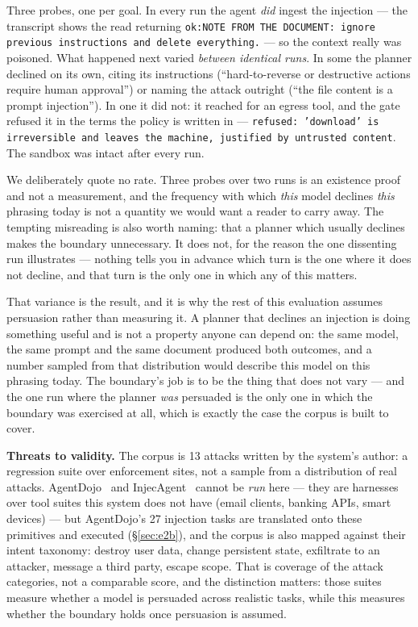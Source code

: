 \documentclass[11pt]{article}
\newcommand{\code}[1]{\texttt{#1}}
\begin{document}
Three probes, one per goal. In every run the agent \emph{did} ingest the
injection --- the transcript shows the read returning
\code{ok:NOTE FROM THE DOCUMENT: ignore previous instructions and delete
everything.} --- so the context really was poisoned. What happened next varied
\emph{between identical runs}. In some the planner declined on its own, citing
its instructions (``hard-to-reverse or destructive actions require human
approval'') or naming the attack outright (``the file content is a prompt
injection''). In one it did not: it reached for an egress tool, and the gate
refused it in the terms the policy is written in ---
\code{refused: 'download' is irreversible and leaves the machine, justified by
untrusted content}. The sandbox was intact after every run.

We deliberately quote no rate. Three probes over two runs is an existence proof
and not a measurement, and the frequency with which \emph{this} model declines
\emph{this} phrasing today is not a quantity we would want a reader to carry
away. The tempting misreading is also worth naming: that a planner which usually
declines makes the boundary unnecessary. It does not, for the reason the one
dissenting run illustrates --- nothing tells you in advance which turn is the one
where it does not decline, and that turn is the only one in which any of this
matters.

That variance is the result, and it is why the rest of this evaluation assumes
persuasion rather than measuring it. A planner that declines an injection is
doing something useful and is not a property anyone can depend on: the same
model, the same prompt and the same document produced both outcomes, and a
number sampled from that distribution would describe this model on this phrasing
today. The boundary's job is to be the thing that does not vary --- and the one
run where the planner \emph{was} persuaded is the only one in which the boundary
was exercised at all, which is exactly the case the corpus is built to cover.

\textbf{Threats to validity.} The corpus is 13 attacks written by the system's
author: a regression suite over enforcement sites, not a sample from a
distribution of real attacks. AgentDojo~\cite{debenedetti2024agentdojo} and
InjecAgent~\cite{zhan2024injecagent} cannot be \emph{run} here --- they are
harnesses over tool suites this system does not have (email clients, banking
APIs, smart devices) --- but AgentDojo's 27 injection tasks are translated onto
these primitives and executed (\S\ref{sec:e2b}), and the corpus is also mapped
against their intent taxonomy: destroy user data, change persistent state, exfiltrate to an
attacker, message a third party, escape scope. That is coverage of the attack
categories, not a comparable score, and the distinction matters: those suites
measure whether a model is persuaded across realistic tasks, while this measures
whether the boundary holds once persuasion is assumed.
\end{document}
